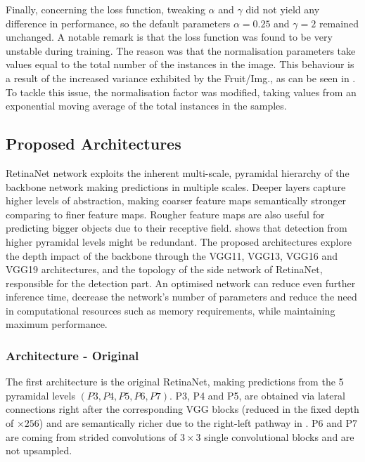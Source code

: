 Finally, concerning the loss function, tweaking $\alpha$ and $\gamma$ did not yield any difference in performance, so the default parameters $\alpha=0.25$ and $\gamma=2$ remained unchanged. A notable remark is that the loss function was found to be very unstable during training. The reason was that the normalisation parameters take values equal to the total number of the instances in the image. This behaviour is a result of the increased variance exhibited by the Fruit/Img., as can be seen in . To tackle this issue, the normalisation factor was modified, taking values from an exponential moving average of the total instances in the samples.
 
\subsection{Proposed Architectures}
RetinaNet network exploits the inherent multi-scale, pyramidal hierarchy of the backbone network making predictions in multiple scales. Deeper layers capture higher levels of abstraction, making coarser feature maps semantically stronger comparing to finer feature maps. Rougher feature maps are also useful for predicting bigger objects due to their receptive field.  shows that detection from higher pyramidal levels might be redundant. The proposed architectures explore the depth impact of the backbone through the VGG11, VGG13, VGG16 and VGG19 architectures, and the topology of the side network of RetinaNet, responsible for the detection part. An optimised network can reduce even further inference time, decrease the network's number of parameters and reduce the need in computational resources such as memory requirements, while maintaining maximum performance.

\subsubsection{Architecture - Original}\label{arch_1} 
The first architecture is the original RetinaNet, making predictions from the 5 pyramidal levels $(P3,P4,P5,P6,P7)$. P3, P4 and P5, are obtained via lateral connections right after the corresponding VGG blocks (reduced in the fixed depth of $\times256$) and are semantically richer due to the right-left pathway in . P6 and P7 are coming from strided convolutions of $3\times3$ single convolutional blocks and are not upsampled.

